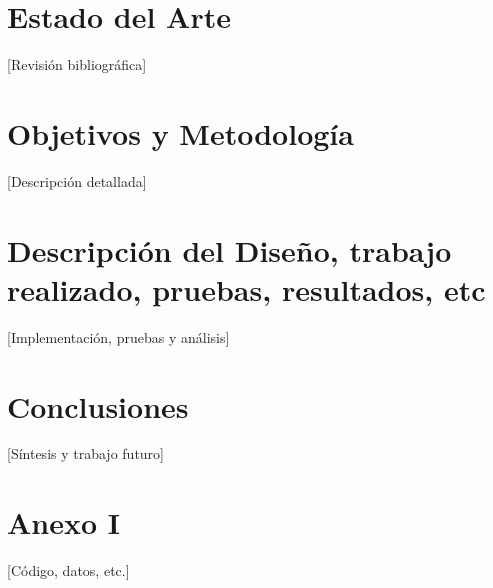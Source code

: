 \documentclass[12pt, a4paper]{article}
\begin{document}
\section{Estado del Arte}
[Revisión bibliográfica]

\section{Objetivos y Metodología}
[Descripción detallada]

\section{Descripción del Diseño, trabajo realizado, pruebas, resultados, etc}
[Implementación, pruebas y análisis]

\section{Conclusiones}
[Síntesis y trabajo futuro]

\cite{ejemplo1}
\cite{ejemplo2}
\cite{ejemplo3}

\newpage



\appendix
\section{Anexo I}
[Código, datos, etc.]
\end{document}
